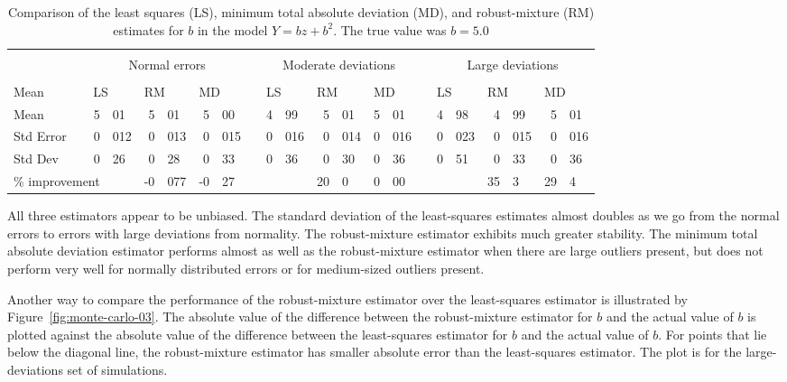 \documentclass{admbmanual}
\begin{document}
\begin{table}[!h]
  \begin{tabular}{ l   *{3}{ c *{3}{r@{.}l } }     }
    \hline\\[-11pt]
    \hline\\[-9.0pt]
              && \multicolumn{6}{c}{Normal errors}
              && \multicolumn{6}{c}{Moderate deviations}
              && \multicolumn{6}{c}{Large deviations}  %
    \\[3pt]
    \cline{3-8}\cline{10-15}\cline{17-22} \\[-6pt]
    Mean
    &&\multicolumn{2}{l}{LS} & \multicolumn{2}{l}{RM} & \multicolumn{2}{l}{MD}
    &&\multicolumn{2}{l}{LS} & \multicolumn{2}{l}{RM} & \multicolumn{2}{l}{MD}
    &&\multicolumn{2}{l}{LS} & \multicolumn{2}{l}{RM} & \multicolumn{2}{l}{MD}\\
    Mean
    & \multicolumn{1}{c}{\qquad} & 5&01 & 5&01 & 5&00
    & \multicolumn{1}{c}{\qquad} & 4&99 & 5&01 & 5&01
    & \multicolumn{1}{c}{\qquad} & 4&98 & 4&99 & 5&01\\
    Std Error
    && 0&012 & 0&013 & 0&015 && 0&016 & 0&014 & 0&016 && 0&023 & 0&015 & 0&016\\
    Std Dev
    && 0&26  & 0&28  & 0&33  && 0&36  & 0&30  & 0&36  &&  0&51 & 0&33  & 0&36\\
    \multicolumn{3}{l}{\% improvement}
    & \multicolumn{1}{c}{} & -0&077 & -0&27
    &&\multicolumn{2}{c}{} & 20&0   &  0&00
    &&\multicolumn{2}{c}{} & 35&3   &  29&4\\[3pt]
    \hline
  \end{tabular}
  \caption{Comparison of the least squares (LS),  minimum total absolute
    deviation (MD), and robust-mixture (RM) estimates for $b$ in the model
    \mbox{$Y=bz+b^2$.} The true value was $b=5.0$}
  \label{tab:robust-nonlinear-regression-01}
\end{table}

All three estimators appear to be unbiased. The standard deviation of the
least-squares estimates almost doubles as we go from the normal errors to errors
with large deviations from normality. The robust-mixture estimator exhibits much
greater stability. The minimum total absolute deviation estimator performs
almost as well as the robust-mixture estimator when there are large outliers
present, but does not perform very well for normally distributed errors or for
medium-sized outliers present.

Another way to compare the performance of the robust-mixture estimator over the
least-squares estimator is illustrated by Figure~\ref{fig:monte-carlo-03}.
The absolute value of the difference between the robust-mixture estimator
for $b$ and the actual value of $b$ is plotted against the
absolute value of the difference between the least-squares estimator for
$b$ and the actual value of $b$. For points that lie below the
diagonal line, the robust-mixture estimator has smaller absolute error
 than the least-squares estimator.
The plot is for the large-deviations set of simulations.
\end{document}
